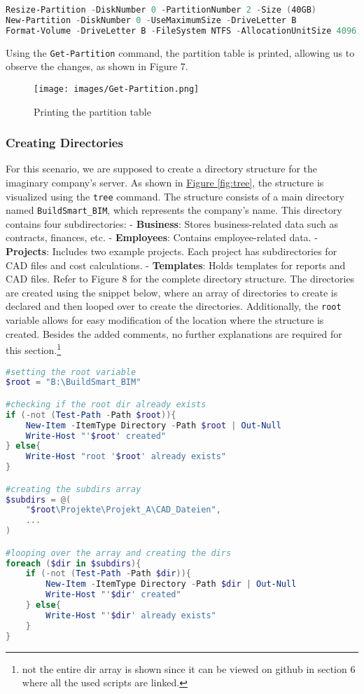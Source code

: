 \documentclass[a4paper]{article}
\newcommand{\abc}{\hfill \break}
\begin{document}
\begin{lstlisting}[language=PowerShell]
Resize-Partition -DiskNumber 0 -PartitionNumber 2 -Size (40GB)
New-Partition -DiskNumber 0 -UseMaximumSize -DriveLetter B
Format-Volume -DriveLetter B -FileSystem NTFS -AllocationUnitSize 4096
\end{lstlisting}
Using the \texttt{Get-Partition} command, the partition table is printed, allowing us to observe the changes, as shown in Figure 7.
\begin{figure}[h]
	\texttt{[image: images/Get-Partition.png]}
	\centering
	\caption{Printing the partition table}
\end{figure}\newpage
\subsubsection{Creating Directories}
For this scenario, we are supposed to create a directory structure for the imaginary company's server.\abc
As shown in \textcolor{blue}{\hyperref[fig:tree]{Figure \ref{fig:tree}}}, the structure is visualized using the \texttt{tree} command. The structure consists of a main directory named \texttt{BuildSmart\_BIM}, which represents the company's name. This directory contains four subdirectories:\abc
- \textbf{Business}: Stores business-related data such as contracts, finances, etc.\abc
- \textbf{Employees}: Contains employee-related data.\abc
- \textbf{Projects}: Includes two example projects. Each project has subdirectories for CAD files and cost calculations.\abc
- \textbf{Templates}: Holds templates for reports and CAD files.\abc
Refer to Figure 8 for the complete directory structure.\abc
The directories are created using the snippet below, where an array of directories to create is declared and then looped over to create the directories. Additionally, the \texttt{root} variable allows for easy modification of the location where the structure is created.\abc
Besides the added comments, no further explanations are required for this section.\footnote{not the entire dir array is shown since it can be viewed on github in section 6 where all the used scripts are linked.}
\begin{lstlisting}[language=PowerShell]
#setting the root variable
$root = "B:\BuildSmart_BIM"

#checking if the root dir already exists
if (-not (Test-Path -Path $root)){
    New-Item -ItemType Directory -Path $root | Out-Null
    Write-Host "'$root' created"
} else{
    Write-Host "root '$root' already exists"
}

#creating the subdirs array
$subdirs = @(
    "$root\Projekte\Projekt_A\CAD_Dateien",
    ...
)

#looping over the array and creating the dirs
foreach ($dir in $subdirs){
    if (-not (Test-Path -Path $dir)){
        New-Item -ItemType Directory -Path $dir | Out-Null
        Write-Host "'$dir' created"
    } else{
        Write-Host "'$dir' already exists"
    }
}
\end{lstlisting}
\end{document}
